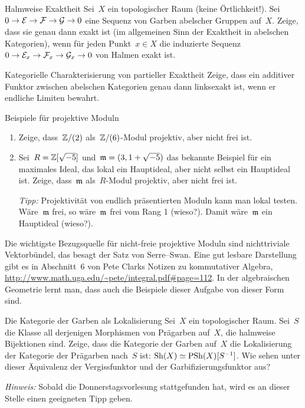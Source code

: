 \documentclass{uebblatt}
\begin{document}

\begin{aufgabe}{Halmweise Exaktheit}
Sei~$X$ ein topologischer Raum (keine Örtlichkeit!). Sei~$0 \to \mathcal{E} \to \mathcal{F} \to
\mathcal{G} \to 0$ eine Sequenz von Garben abelscher Gruppen auf~$X$. Zeige, dass sie
genau dann exakt ist (im allgemeinen Sinn der Exaktheit in abelschen
Kategorien), wenn für jeden Punkt~$x \in X$ die induzierte Sequenz~$0 \to \mathcal{E}_x
\to \mathcal{F}_x \to \mathcal{G}_x \to 0$ von Halmen exakt ist.
\end{aufgabe}

\begin{aufgabe}{Kategorielle Charakterisierung von partieller Exaktheit}
Zeige, dass ein additiver Funktor zwischen abelschen Kategorien genau dann
linksexakt ist, wenn er endliche Limiten bewahrt.
\end{aufgabe}

\begin{aufgabe}{Beispiele für projektive Moduln}
\begin{enumerate}
\item Zeige, dass~$\mathbb{Z}/(2)$ als~$\mathbb{Z}/(6)$-Modul projektiv, aber
nicht frei ist.
\item Sei~$R = \mathbb{Z}[\sqrt{-5}]$ und~$\mathfrak{m} = (3, 1+\sqrt{-5})$ das bekannte
Beispiel für ein maximales Ideal, das lokal ein Hauptideal, aber nicht selbst
ein Hauptideal ist. Zeige, dass~$\mathfrak{m}$ als~$R$-Modul projektiv, aber nicht frei
ist.

\emph{Tipp:} Projektivität von endlich präsentierten Moduln kann man lokal
testen. Wäre~$\mathfrak{m}$ frei, so wäre~$\mathfrak{m}$ frei vom Rang 1 (wieso?). Damit
wäre~$\mathfrak{m}$ ein Hauptideal (wieso?).
\end{enumerate}

{\scriptsize Die wichtigste Bezugsquelle für nicht-freie projektive Moduln sind
nichttriviale Vektorbündel, das besagt der Satz von Serre--Swan. Eine gut
lesbare Darstellung gibt es in Abschnitt~6 von Pete Clarks Notizen zu
kommutativer Algebra, \url{http://www.math.uga.edu/~pete/integral.pdf#page=112}.
In der algebraischen Geometrie lernt man, dass auch die Beispiele dieser
Aufgabe von dieser Form sind.\par}
\end{aufgabe}

\begin{aufgabe}{Die Kategorie der Garben als Lokalisierung}
Sei~$X$ ein topologischer Raum. Sei~$S$ die Klasse all
derjenigen Morphismen von Prägarben auf~$X$, die halmweise Bijektionen sind.
Zeige, dass die Kategorie der Garben auf~$X$ die Lokalisierung der Kategorie
der Prägarben nach~$S$ ist: $\mathrm{Sh}(X) \simeq \mathrm{PSh}(X)[S^{-1}]$. Wie sehen unter
dieser Äquivalenz der Vergissfunktor und der Garbifizierungsfunktor aus?

\emph{Hinweis:} Sobald die Donnerstagsvorlesung stattgefunden hat, wird es an
dieser Stelle einen geeigneten Tipp geben.
\end{aufgabe}
\end{document}
